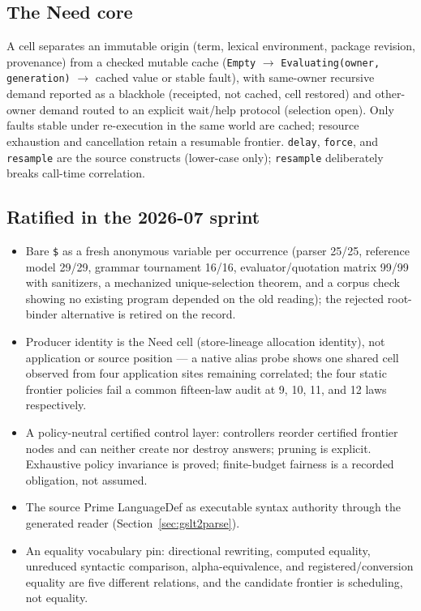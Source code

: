 \documentclass[11pt]{article}
\newcommand{\code}[1]{\texttt{#1}}
\begin{document}
\subsection{The Need core}

A cell separates an immutable origin (term, lexical environment, package
revision, provenance) from a checked mutable cache
(\code{Empty} $\to$ \code{Evaluating(owner, generation)} $\to$
cached value or stable fault), with same-owner recursive demand reported
as a blackhole (receipted, not cached, cell restored) and other-owner
demand routed to an explicit wait/help protocol (selection open).  Only
faults stable under re-execution in the same world are cached; resource
exhaustion and cancellation retain a resumable frontier.  \code{delay},
\code{force}, and \code{resample} are the source constructs (lower-case only);
\code{resample} deliberately breaks call-time correlation.

\subsection{Ratified in the 2026-07 sprint}

\begin{itemize}
\item Bare \code{\$} as a fresh anonymous variable per occurrence
  (parser 25/25, reference model 29/29, grammar tournament 16/16,
  evaluator/quotation matrix 99/99 with sanitizers, a mechanized
  unique-selection theorem, and a corpus check showing no existing
  program depended on the old reading); the rejected root-binder
  alternative is retired on the record.
\item Producer identity is the Need cell (store-lineage allocation
  identity), not application or source position --- a native alias probe
  shows one shared cell observed from four application sites remaining
  correlated; the four static frontier policies fail a common fifteen-law
  audit at 9, 10, 11, and 12 laws respectively.
\item A policy-neutral certified control layer: controllers reorder
  certified frontier nodes and can neither create nor destroy answers;
  pruning is explicit.  Exhaustive policy invariance is proved;
  finite-budget fairness is a recorded obligation, not assumed.
\item The source Prime LanguageDef as executable syntax authority
  through the generated reader (Section~\ref{sec:gslt2parse}).
\item An equality vocabulary pin: directional rewriting, computed
  equality, unreduced syntactic comparison, alpha-equivalence, and
  registered/conversion equality are five different relations, and the
  candidate frontier is scheduling, not equality.
\end{itemize}
\end{document}
